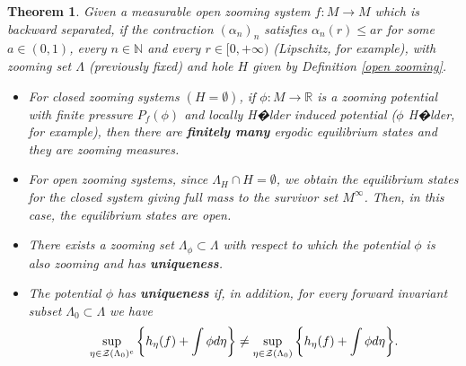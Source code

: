 \documentclass[12pt,a4paper]{amsart}
\theoremstyle{plain}
\newtheorem{theorema}{Theorem}
\begin{document}
\begin{theorema}
	\label{B}
	Given a measurable open zooming system $f:M \to M$ which is backward separated, if the contraction $(\alpha_{n})_{n}$ satisfies $\alpha_{n}(r) \leq ar$ for some $a \in (0,1)$, every $n \in \mathbb{N}$ and every $r \in [0,+\infty)$ (Lipschitz, for example), with zooming set  $\Lambda$ (previously fixed) and hole $H$ given by Definition \ref{open zooming}. 
	
	\begin{itemize}
		
		\item For closed zooming systems $(H = \emptyset)$, if $\phi:M \to \mathbb{R}$ is a zooming potential with  finite pressure $P_{f}(\phi)$ and locally H�lder induced potential ($\phi$ H�lder, for example), then there are \textbf{\textit{finitely many}}  ergodic equilibrium states and they are zooming measures.  
		
		\item For open zooming systems, since $\Lambda_{H} \cap H = \emptyset$, we obtain the equilibrium states for the closed system giving full mass to the survivor set $M^{\infty}$. Then, in this case, the equilibrium states are open.
		
		\item There exists a zooming set $\Lambda_{\phi} \subset \Lambda$ with respect to which the potential $\phi$ is also zooming and has \textbf{\textit{uniqueness}}.
		
		\item The potential $\phi$ has \textbf{\textit{uniqueness}} if, in addition, for every forward invariant subset $\Lambda_{0} \subset \Lambda$  we have
		\[
		\displaystyle  \sup_{\eta \in \mathcal{Z}(\Lambda_{0})^{c}} \bigg{\{} h_{\eta}(f) + \int \phi d\eta \bigg{\}} \neq \sup_{\eta \in \mathcal{Z}(\Lambda_{0})} \bigg{\{} h_{\eta}(f) + \int \phi d\eta \bigg{\}}.
		\]
	\end{itemize}
\end{theorema}
\end{document}
